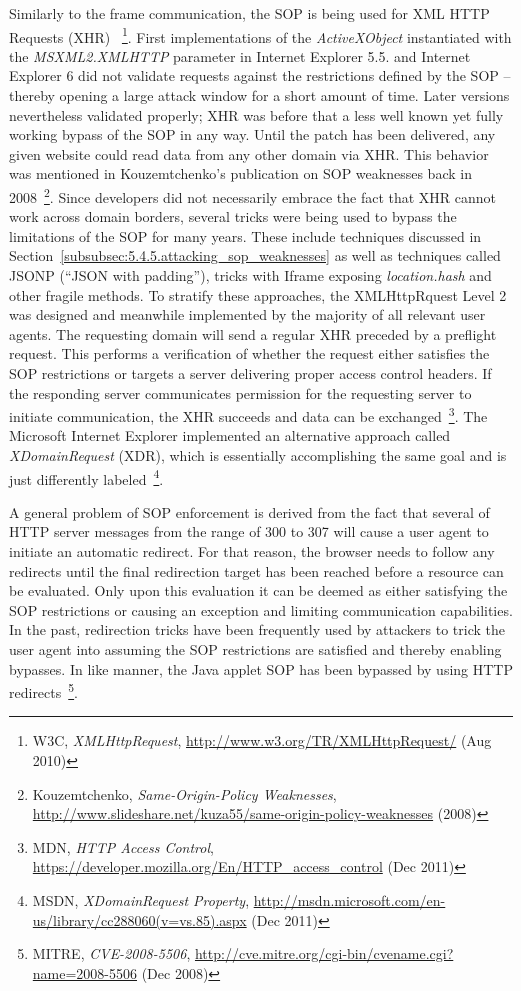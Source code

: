 	Similarly to the frame communication, the SOP is being used for XML HTTP Requests (XHR) ~\footnote{W3C, \textit{XMLHttpRequest}, \url{http://www.w3.org/TR/XMLHttpRequest/} (Aug 2010)}. First implementations of the \textit{ActiveXObject} instantiated with the \textit{MSXML2.XMLHTTP} parameter in Internet Explorer 5.5. and Internet Explorer 6 did not validate requests against the restrictions defined by the SOP -- thereby opening a large attack window for a short amount of time. Later versions nevertheless validated properly; XHR was before that a less well known yet fully working bypass of the SOP in any way. Until the patch has been delivered, any given website could read data from any other domain via XHR. This behavior was mentioned in Kouzemtchenko's publication on SOP weaknesses back in 2008~\footnote{Kouzemtchenko, \textit{Same-Origin-Policy Weaknesses}, \url{http://www.slideshare.net/kuza55/same-origin-policy-weaknesses} (2008)}. Since developers did not necessarily embrace the fact that XHR cannot 
work across 
domain borders, several tricks were being used to bypass the limitations of the SOP for many years. These include techniques discussed in Section~\ref{subsubsec:5.4.5.attacking_sop_weaknesses} as well as techniques called JSONP (``JSON with padding''), tricks with Iframe exposing \textit{location.hash} and other fragile methods. To stratify these approaches, the XMLHttpRquest Level 2 was designed and meanwhile implemented by the majority of all relevant user agents. 
	The requesting domain will send a regular XHR preceded by a preflight request. This performs a verification of whether the request either satisfies the SOP restrictions or targets a server delivering proper access control headers. If the responding server communicates permission for the requesting server to initiate communication, the XHR succeeds and data can be exchanged~\footnote{MDN, \textit{HTTP Access Control}, \url{https://developer.mozilla.org/En/HTTP_access_control} (Dec 2011)}. The Microsoft Internet Explorer implemented an alternative approach called \textit{XDomainRequest} (XDR), which is essentially accomplishing the same goal and is just differently labeled~\footnote{MSDN, \textit{XDomainRequest Property}, \url{http://msdn.microsoft.com/en-us/library/cc288060(v=vs.85).aspx} (Dec 2011)}.

	A general problem of SOP enforcement is derived from the fact that several of HTTP server messages from the range of 300 to 307 will cause a user agent to initiate an automatic redirect. For that reason, the browser needs to follow any redirects until the final redirection target has been reached before a resource can be evaluated. Only upon this evaluation it can be deemed as either satisfying the SOP restrictions or causing an exception and limiting communication capabilities. In the past, redirection tricks have been frequently used by attackers to trick the user agent into assuming the SOP restrictions are satisfied and thereby enabling bypasses. In like manner, the Java applet SOP has been bypassed by using HTTP redirects~\footnote{MITRE, \textit{CVE-2008-5506}, \url{http://cve.mitre.org/cgi-bin/cvename.cgi?name=2008-5506} (Dec 2008)}. \\

